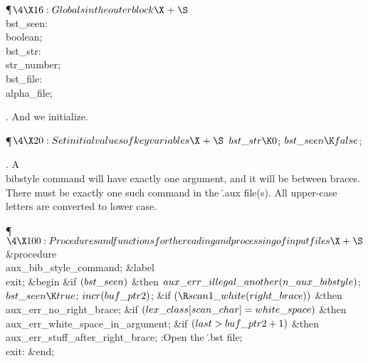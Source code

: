 \Y\P$\4\X16:Globals in the outer block\X\mathrel{+}\S$\6
\4\\{bst\_seen}: \\{boolean};\6
\4\\{bst\_str}: \\{str\_number};\6
\4\\{bst\_file}: \\{alpha\_file};\par
\fi

.
And we initialize.

\Y\P$\4\X20:Set initial values of key variables\X\mathrel{+}\S$\6
$\\{bst\_str}\K0$;\6
$\\{bst\_seen}\K\\{false}$;\par
\fi

.
A \.{\\bibstyle} command will have exactly one argument, and it will
be between braces.  There must be exactly one such command in the
\.{.aux} file(s).  All upper-case letters are converted to lower case.

\Y\P$\4\X100:Procedures and functions for the reading and processing of input
files\X\mathrel{+}\S$\6
\4\&{procedure}\1\  \\{aux\_bib\_style\_command};\6
\4\&{label} \\{exit};\2\6
\&{begin} \&{if} $(\\{bst\_seen})$ \1\&{then}\5
$\\{aux\_err\_illegal\_another}(\\{n\_aux\_bibstyle})$;\2\6
$\\{bst\_seen}\K\\{true}$;\6
$\\{incr}(\\{buf\_ptr2})$;\6
\&{if} $(\R\\{scan1\_white}(\\{right\_brace}))$ \1\&{then}\5
\\{aux\_err\_no\_right\_brace};\2\6
\&{if} $(\\{lex\_class}[\\{scan\_char}]=\\{white\_space})$ \1\&{then}\5
\\{aux\_err\_white\_space\_in\_argument};\2\6
\&{if} $(\\{last}>\\{buf\_ptr2}+1)$ \1\&{then}\5
\\{aux\_err\_stuff\_after\_right\_brace};\2\6
:Open the \.{.bst} file\X;\6
\4\\{exit}: \&{end};\par
\fi


